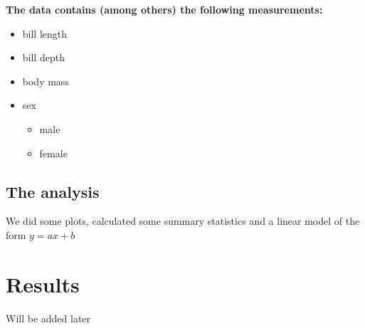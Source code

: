 \documentclass[
]{article}
\providecommand{\tightlist}{%
  \setlength{\itemsep}{0pt}\setlength{\parskip}{0pt}}
\begin{document}
\textbf{The data contains (among others) the following measurements:}

\begin{itemize}
\tightlist
\item
  bill length
\item
  bill depth
\item
  body mass
\item
  sex

  \begin{itemize}
  \tightlist
  \item
    male
  \item
    female
  \end{itemize}
\end{itemize}

\hypertarget{the-analysis}{%
\subsection{The analysis}\label{the-analysis}}

We did some plots, calculated some summary statistics and a linear model
of the form \(y = ax + b\)

\hypertarget{results}{%
\section{Results}\label{results}}

Will be added later
\end{document}
